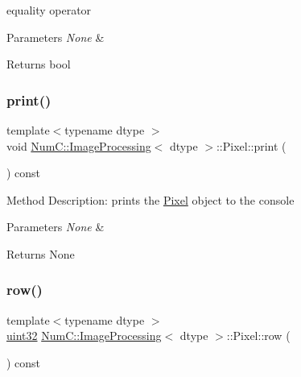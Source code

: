 equality operator


\begin{DoxyParams}{Parameters}
{\em None} & \\
\hline
\end{DoxyParams}
\begin{DoxyReturn}{Returns}
bool 
\end{DoxyReturn}
\mbox{\label{class_num_c_1_1_image_processing_1_1_pixel_ab66e64a517458415dcbd4c2e227c494c}} 
\subsubsection{\texorpdfstring{print()}{print()}}
{\footnotesize\ttfamily template$<$typename dtype $>$ \\
void \mbox{\hyperlink{class_num_c_1_1_image_processing}{Num\+C\+::\+Image\+Processing}}$<$ dtype $>$\+::Pixel\+::print (\begin{DoxyParamCaption}{ }\end{DoxyParamCaption}) const\hspace{0.3cm}{\ttfamily [inline]}}

Method Description\+: prints the \mbox{\hyperlink{class_num_c_1_1_image_processing_1_1_pixel}{Pixel}} object to the console


\begin{DoxyParams}{Parameters}
{\em None} & \\
\hline
\end{DoxyParams}
\begin{DoxyReturn}{Returns}
None 
\end{DoxyReturn}
\mbox{\label{class_num_c_1_1_image_processing_1_1_pixel_a436cfd82dc144afa2d3cfe134bc872fd}} 
\subsubsection{\texorpdfstring{row()}{row()}}
{\footnotesize\ttfamily template$<$typename dtype $>$ \\
\mbox{\hyperlink{namespace_num_c_ae685802ca6d3035f2b400b081e3953fa}{uint32}} \mbox{\hyperlink{class_num_c_1_1_image_processing}{Num\+C\+::\+Image\+Processing}}$<$ dtype $>$\+::Pixel\+::row (\begin{DoxyParamCaption}{ }\end{DoxyParamCaption}) const\hspace{0.3cm}{\ttfamily [inline]}}

